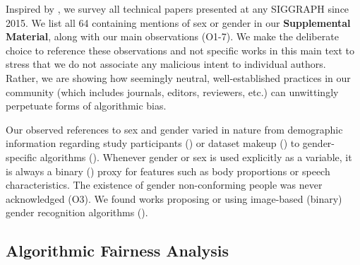 \documentclass[nonacm,sigconf,review,balance=false]{acmart}
\begin{document}

Inspired by \citet{keyes2018misgendering}, we survey
all technical papers presented at any SIGGRAPH since 2015. We list all 64 containing mentions of sex or gender in our \textbf{Supplemental Material}, along with our main observations (O1-7). We make the deliberate choice to reference these observations and not specific works in this main text to stress that we do not associate any malicious intent to individual authors. Rather, we are showing how seemingly neutral, well-established practices in our community (which includes journals, editors, reviewers, etc.) can unwittingly perpetuate forms of algorithmic bias.

Our observed references to sex and gender varied in nature from demographic information regarding study participants (\userstudy) or dataset makeup (\dataset) to gender-specific algorithms (\var). Whenever gender or sex is used
explicitly as a variable, it is always a binary (\binary) proxy for features such as body proportions or speech characteristics. The existence of gender non-conforming people was never acknowledged (O3). We found works proposing or using image-based (binary) gender recognition algorithms (\classifier).


\vspace{-0.1cm}
\subsection{Algorithmic Fairness Analysis}\label{sec:analysis}
\end{document}

